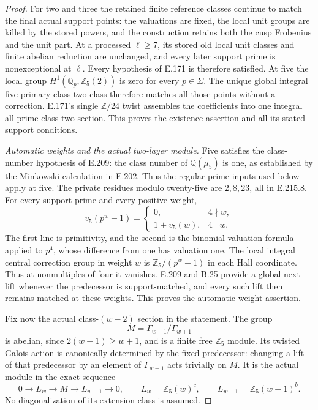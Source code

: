 \begin{proof}
For two and three the retained finite reference classes continue to
match the final actual support points: the valuations are fixed, the
local unit groups are killed by the stored powers, and the construction
retains both the cusp Frobenius and the unit part. At a processed
$\ell\ge7$, its stored old local unit classes and finite abelian
reduction are unchanged, and every later support prime is nonexceptional
at $\ell$. Every hypothesis of E.171 is therefore satisfied. At five
the local group $H^1(\mathbb Q_p,\mathbb Z_5(2))$ is zero for every
$p\in\Sigma$. The unique global integral five-primary class-two class
therefore matches all those points without a correction. E.171's single
$\mathbb Z/24$ twist assembles the coefficients into one integral
all-prime class-two section. This proves the existence assertion and
all its stated support conditions.

\emph{Automatic weights and the actual two-layer module.}
Five satisfies the class-number hypothesis of E.209: the class number of
$\mathbb Q(\mu_5)$ is one, as established by the Minkowski calculation
in E.202. Thus the regular-prime inputs used below apply at five.
The private residues modulo twenty-five are $2,8,23$, all in E.215.8.
For every support prime and every positive weight,
\[
 v_5(p^w-1)=
 \begin{cases}0,&4\nmid w,\\1+v_5(w),&4\mid w.
 \end{cases}
 \tag{E.215.9}
\]
The first line is primitivity, and the second is the binomial valuation
formula applied to $p^4$, whose difference from one has valuation one.
The local integral central correction group in weight $w$ is
$\mathbb Z_5/(p^w-1)$ in each Hall coordinate. Thus at nonmultiples
of four it vanishes. E.209 and B.25 provide a global next lift whenever
the predecessor is support-matched, and every such lift then remains
matched at these weights. This proves the automatic-weight assertion.

Fix now the actual class-$(w-2)$ section in the statement. The group
\[
                 M=\Gamma_{w-1}/\Gamma_{w+1}
 \tag{E.215.10}
\]
is abelian, since $2(w-1)\ge w+1$, and is a finite free
$\mathbb Z_5$ module. Its twisted Galois action is canonically determined
by the fixed predecessor: changing a lift of that predecessor by an
element of $\Gamma_{w-1}$ acts trivially on $M$. It is the actual module
in the exact sequence
\[
 0\longrightarrow L_w\longrightarrow M\longrightarrow L_{w-1}
 \longrightarrow0,
 \qquad L_w=\mathbb Z_5(w)^c,\qquad
 L_{w-1}=\mathbb Z_5(w-1)^b.
 \tag{E.215.11}
\]
No diagonalization of its extension class is assumed.


\end{proof}
